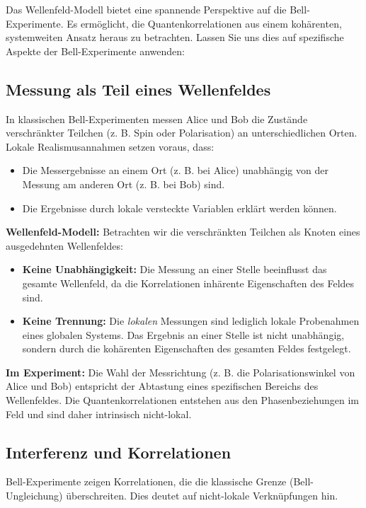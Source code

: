 \documentclass[12pt,a4paper]{article}
\begin{document}
	Das Wellenfeld-Modell bietet eine spannende Perspektive auf die Bell-Experimente. Es ermöglicht, die Quantenkorrelationen aus einem kohärenten, systemweiten Ansatz heraus zu betrachten. Lassen Sie uns dies auf spezifische Aspekte der Bell-Experimente anwenden:
	
	
	\subsection{Messung als Teil eines Wellenfeldes}
	In klassischen Bell-Experimenten messen Alice und Bob die Zustände verschränkter Teilchen (z. B. Spin oder Polarisation) an unterschiedlichen Orten. Lokale Realismusannahmen setzen voraus, dass:
	\begin{itemize}
		\item Die Messergebnisse an einem Ort (z. B. bei Alice) unabhängig von der Messung am anderen Ort (z. B. bei Bob) sind.
		\item Die Ergebnisse durch lokale versteckte Variablen erklärt werden können.
	\end{itemize}
	
	\textbf{Wellenfeld-Modell:}
	Betrachten wir die verschränkten Teilchen als Knoten eines ausgedehnten Wellenfeldes:
	\begin{itemize}
		\item \textbf{Keine Unabhängigkeit:} Die Messung an einer Stelle beeinflusst das gesamte Wellenfeld, da die Korrelationen inhärente Eigenschaften des Feldes sind.
		\item \textbf{Keine Trennung:} Die \textit{lokalen} Messungen sind lediglich lokale Probenahmen eines globalen Systems. Das Ergebnis an einer Stelle ist nicht unabhängig, sondern durch die kohärenten Eigenschaften des gesamten Feldes festgelegt.
	\end{itemize}
	
	\textbf{Im Experiment:}
	Die Wahl der Messrichtung (z. B. die Polarisationswinkel von Alice und Bob) entspricht der Abtastung eines spezifischen Bereichs des Wellenfeldes. Die Quantenkorrelationen entstehen aus den Phasenbeziehungen im Feld und sind daher intrinsisch nicht-lokal.
	
	\subsection{Interferenz und Korrelationen}
	Bell-Experimente zeigen Korrelationen, die die klassische Grenze (Bell-Ungleichung) überschreiten. Dies deutet auf nicht-lokale Verknüpfungen hin.
	
\end{document}
